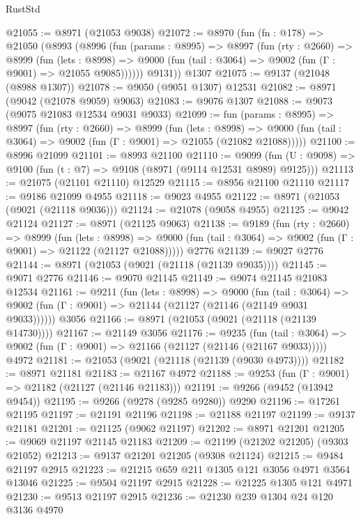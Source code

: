 \begin{lexlean}{RustStd}
\begin{coremodule}
@21055 := @8971 (@21053 @9038)
@21072 := @8970
    (fun (fn : @178) =>
    @21050
      (@8993
        (@8996
          (fun (params : @8995) =>
          @8997
            (fun (rty : @2660) =>
            @8999
              (fun (lets : @8998) =>
              @9000 (fun (tail : @3064) => @9002 (fun (Γ : @9001) => @21055 @9085))))))
        @9131))
    @1307
@21075 := @9137 (@21048 (@8988 @1307))
@21078 := @9050 (@9051 @1307) @12531
@21082 := @8971 (@9042 (@21078 @9059) @9063)
@21083 := @9076 @1307
@21088 := @9073 (@9075 @21083 @12534 @9031 @9033)
@21099 := fun (params : @8995) =>
  @8997
    (fun (rty : @2660) =>
    @8999
      (fun (lets : @8998) =>
      @9000 (fun (tail : @3064) => @9002 (fun (Γ : @9001) => @21055 (@21082 @21088)))))
@21100 := @8996 @21099
@21101 := @8993 @21100
@21110 := @9099
    (fun (U : @9098) => @9100 (fun (t : @7) => @9108 (@8971 (@9114 @12531 @8989) @9125)))
@21113 := @21075 (@21101 @21110) @12529
@21115 := @8956 @21100 @21110
@21117 := @9186 @21099 @4955
@21118 := @9023 @4955
@21122 := @8971 (@21053 (@9021 (@21118 @9036)))
@21124 := @21078 (@9058 @4955)
@21125 := @9042 @21124
@21127 := @8971 (@21125 @9063)
@21138 := @9189
    (fun (rty : @2660) =>
    @8999
      (fun (lets : @8998) =>
      @9000 (fun (tail : @3064) => @9002 (fun (Γ : @9001) => @21122 (@21127 @21088)))))
    @2776
@21139 := @9027 @2776
@21144 := @8971 (@21053 (@9021 (@21118 (@21139 @9035))))
@21145 := @9071 @2776
@21146 := @9070 @21145
@21149 := @9074 @21145 @21083 @12534
@21161 := @9211
    (fun (lets : @8998) =>
    @9000
      (fun (tail : @3064) =>
      @9002 (fun (Γ : @9001) => @21144 (@21127 (@21146 (@21149 @9031 @9033))))))
    @3056
@21166 := @8971 (@21053 (@9021 (@21118 (@21139 @14730))))
@21167 := @21149 @3056
@21176 := @9235
    (fun (tail : @3064) => @9002 (fun (Γ : @9001) => @21166 (@21127 (@21146 (@21167 @9033)))))
    @4972
@21181 := @21053 (@9021 (@21118 (@21139 (@9030 @4973))))
@21182 := @8971 @21181
@21183 := @21167 @4972
@21188 := @9253 (fun (Γ : @9001) => @21182 (@21127 (@21146 @21183)))
@21191 := @9266 (@9452 (@13942 @9454))
@21195 := @9266 (@9278 (@9285 @9280)) @9290
@21196 := @17261 @21195
@21197 := @21191 @21196
@21198 := @21188 @21197
@21199 := @9137 @21181
@21201 := @21125 (@9062 @21197)
@21202 := @8971 @21201
@21205 := @9069 @21197 @21145 @21183
@21209 := @21199 (@21202 @21205) (@9303 @21052)
@21213 := @9137 @21201 @21205 (@9308 @21124)
@21215 := @9484 @21197 @2915
@21223 := @21215 @659 @211 @1305 @121 @3056 @4971 @3564 @13046
@21225 := @9504 @21197 @2915
@21228 := @21225 @1305 @121 @4971
@21230 := @9513 @21197 @2915
@21236 := @21230 @239 @1304 @24 @120 @3136 @4970

\end{coremodule}
\end{lexlean}
